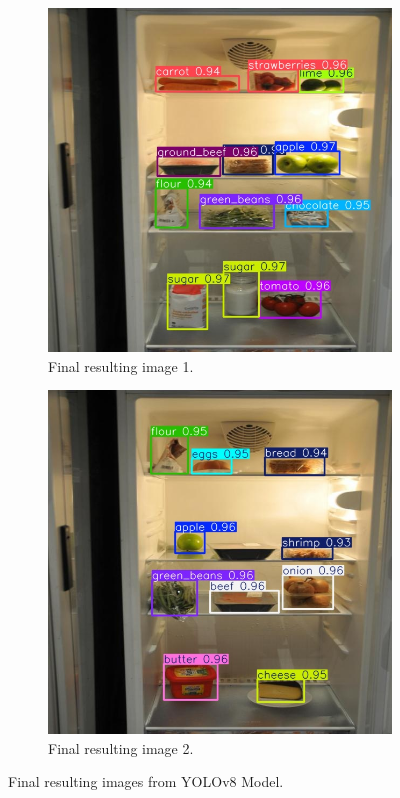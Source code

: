 \documentclass[letterpaper,11pt]{report}
\begin{document}

\begin{figure}[h!]
    \centering
    \begin{subfigure}[t]{0.6\textwidth}
        \centering
        \includegraphics[width=\textwidth]{result1.jpg}
        \caption{Final resulting image 1.}
        \label{fig:result1}
    \end{subfigure}
    \hfill
    \begin{subfigure}[t]{0.6\textwidth}
        \centering
        \includegraphics[width=\textwidth]{result2.jpg}
        \caption{Final resulting image 2.}
        \label{fig:result2}
    \end{subfigure}
    \caption{Final resulting images from YOLOv8 Model.}
    \label{fig:final_results}
\end{figure}
\end{document}

